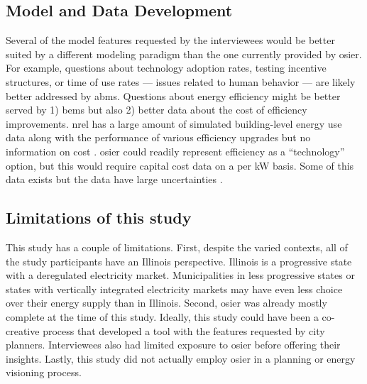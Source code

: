 \subsection{Model and Data Development}
Several of the model features requested by the interviewees would be better
suited by a different modeling paradigm than the one currently provided by
\ac{osier}. For example, questions about technology adoption rates, testing
incentive structures, or time of use rates --- issues related to human behavior
--- are likely better addressed by \acp{abm}. Questions about energy efficiency
might be better served by 1) \acp{bem} but also 2) better data about the cost of
efficiency improvements. \ac{nrel} has a large amount of simulated building-level energy use data along with the performance of various efficiency upgrades
but no information on cost \cite{wilson_end-use_2022}. \ac{osier} could readily
represent efficiency as a ``technology'' option, but this would require capital
cost data on a per kW basis. Some of this data exists but
the data have large uncertainties \cite{less_cost_2021}.


\subsection{Limitations of this study}
This study has a couple of limitations. First, despite the varied contexts, all
of the study participants have an Illinois perspective. Illinois is a
progressive state with a deregulated electricity market. Municipalities in less
progressive states or states with vertically integrated electricity markets may
have even less choice over their energy supply than in Illinois. Second,
\ac{osier} was already mostly complete at the time of this study. Ideally, this
study could have been a co-creative process that developed a tool with the
features requested by city planners. Interviewees also had limited exposure to
\ac{osier} before offering their insights. Lastly, this study did not actually
employ \ac{osier} in a planning or energy visioning process.